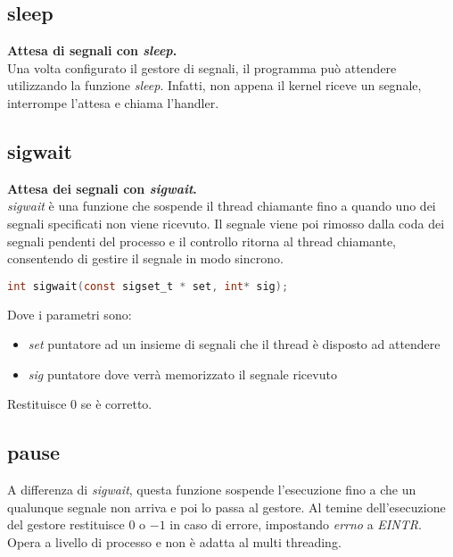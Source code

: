 \subsection{sleep}
\textbf{Attesa di segnali con \textit{sleep}.}\\
Una volta configurato il gestore di segnali, il programma può attendere utilizzando la funzione \textit{sleep}. Infatti, non appena il kernel riceve un segnale, interrompe l'attesa e chiama l'handler.

\subsection{sigwait}
\textbf{Attesa dei segnali con \textit{sigwait}.}\\
\textit{sigwait} è una funzione che sospende il thread chiamante fino a quando uno dei segnali specificati non viene ricevuto. Il segnale viene poi rimosso dalla coda dei segnali pendenti del processo e il controllo ritorna al thread chiamante, consentendo di gestire il segnale in modo sincrono.
\begin{lstlisting}[language=C]
	int sigwait(const sigset_t * set, int* sig);
\end{lstlisting}
Dove i parametri sono:
\begin{itemize}
	\item \textit{set} puntatore ad un insieme di segnali che il thread è disposto ad attendere
	\item \textit{sig} puntatore dove verrà memorizzato il segnale ricevuto
\end{itemize}
Restituisce $0$ se è corretto.

\subsection{pause}
A differenza di \textit{sigwait}, questa funzione sospende l'esecuzione fino a che un qualunque segnale non arriva e poi lo passa al gestore. Al temine dell'esecuzione del gestore restituisce $0$ o $-1$ in caso di errore, impostando \textit{errno} a \textit{EINTR}. Opera a livello di processo e non è adatta al multi threading.

